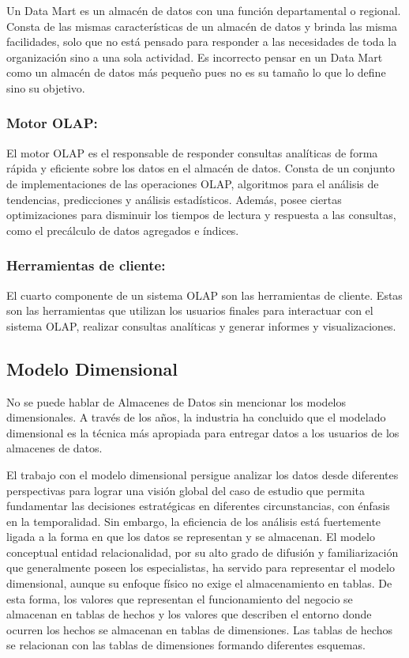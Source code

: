 Un Data Mart es un almac\'en de datos con una funci\'on departamental o regional. Consta de las mismas caracter\'isticas de un 
almacén de datos y brinda las misma facilidades, solo que no est\'a pensado para responder a las necesidades de toda la organización
sino a una sola actividad. Es incorrecto pensar en un Data Mart como un almac\'en de datos m\'as pequeño pues no es su tamaño 
lo que lo define sino su objetivo\cite{mijailmaster}.


\subsubsection{Motor OLAP:}
El motor OLAP es el responsable de responder consultas analíticas de forma rápida y eficiente sobre 
los datos en el almacén de datos. Consta de un conjunto de implementaciones de las operaciones OLAP, algoritmos 
para el análisis de tendencias, predicciones y análisis estadísticos. Además, posee ciertas optimizaciones para 
disminuir los tiempos de lectura y respuesta a las consultas, como el precálculo de datos agregados e índices.
 
\subsubsection{Herramientas de cliente:}
El cuarto componente de un sistema OLAP son las herramientas de cliente. Estas son las herramientas que utilizan los 
usuarios finales para interactuar con el sistema OLAP, realizar consultas analíticas y generar informes y visualizaciones.


\subsection{Modelo Dimensional}

No se puede hablar de Almacenes de Datos sin mencionar los modelos dimensionales. A través de los a\~{n}os, la industria 
ha concluido que el modelado dimensional es la técnica m\'as apropiada para entregar datos a los usuarios de los 
almacenes de datos.

El trabajo con el modelo dimensional persigue analizar los datos desde diferentes perspectivas para lograr una visión 
global del caso de estudio que permita fundamentar las decisiones estratégicas en diferentes circunstancias, con énfasis 
en la temporalidad. Sin embargo, la eficiencia de los análisis est\'a fuertemente ligada a la forma en que los datos 
se representan y se almacenan. El modelo conceptual entidad relacionalidad, por su alto grado de difusión y familiarización que generalmente 
poseen los especialistas, ha servido para representar el modelo dimensional, aunque su enfoque f\'isico 
no exige el almacenamiento en tablas. De esta forma, los valores que representan el funcionamiento del negocio se almacenan 
en tablas de hechos y los valores que describen el entorno donde ocurren los hechos se almacenan en tablas de dimensiones.
Las tablas de hechos se relacionan con las tablas de dimensiones formando diferentes esquemas.

